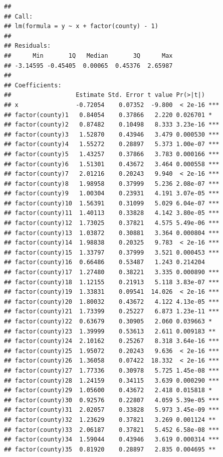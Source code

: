 \documentclass[ignorenonframetext,]{beamer}
\begin{document}
\begin{frame}[fragile]{}

\begin{verbatim}
## 
## Call:
## lm(formula = y ~ x + factor(county) - 1)
## 
## Residuals:
##      Min       1Q   Median       3Q      Max 
## -3.14595 -0.45405  0.00065  0.45376  2.65987 
## 
## Coefficients:
##                  Estimate Std. Error t value Pr(>|t|)    
## x                -0.72054    0.07352  -9.800  < 2e-16 ***
## factor(county)1   0.84054    0.37866   2.220 0.026701 *  
## factor(county)2   0.87482    0.10498   8.333 3.23e-16 ***
## factor(county)3   1.52870    0.43946   3.479 0.000530 ***
## factor(county)4   1.55272    0.28897   5.373 1.00e-07 ***
## factor(county)5   1.43257    0.37866   3.783 0.000166 ***
## factor(county)6   1.51301    0.43672   3.464 0.000558 ***
## factor(county)7   2.01216    0.20243   9.940  < 2e-16 ***
## factor(county)8   1.98958    0.37999   5.236 2.08e-07 ***
## factor(county)9   1.00304    0.23931   4.191 3.07e-05 ***
## factor(county)10  1.56391    0.31099   5.029 6.04e-07 ***
## factor(county)11  1.40113    0.33828   4.142 3.80e-05 ***
## factor(county)12  1.73025    0.37821   4.575 5.49e-06 ***
## factor(county)13  1.03872    0.30881   3.364 0.000804 ***
## factor(county)14  1.98838    0.20325   9.783  < 2e-16 ***
## factor(county)15  1.33797    0.37999   3.521 0.000453 ***
## factor(county)16  0.66486    0.53487   1.243 0.214204    
## factor(county)17  1.27480    0.38221   3.335 0.000890 ***
## factor(county)18  1.12155    0.21913   5.118 3.83e-07 ***
## factor(county)19  1.33831    0.09541  14.026  < 2e-16 ***
## factor(county)20  1.80032    0.43672   4.122 4.13e-05 ***
## factor(county)21  1.73399    0.25227   6.873 1.23e-11 ***
## factor(county)22  0.63679    0.30905   2.060 0.039663 *  
## factor(county)23  1.39999    0.53613   2.611 0.009183 ** 
## factor(county)24  2.10162    0.25267   8.318 3.64e-16 ***
## factor(county)25  1.95072    0.20243   9.636  < 2e-16 ***
## factor(county)26  1.36058    0.07422  18.332  < 2e-16 ***
## factor(county)27  1.77336    0.30978   5.725 1.45e-08 ***
## factor(county)28  1.24159    0.34115   3.639 0.000290 ***
## factor(county)29  1.05600    0.43672   2.418 0.015818 *  
## factor(county)30  0.92576    0.22807   4.059 5.39e-05 ***
## factor(county)31  2.02057    0.33828   5.973 3.45e-09 ***
## factor(county)32  1.23629    0.37821   3.269 0.001124 ** 
## factor(county)33  2.06187    0.37821   5.452 6.58e-08 ***
## factor(county)34  1.59044    0.43946   3.619 0.000314 ***
## factor(county)35  0.81920    0.28897   2.835 0.004695 ** 

\end{verbatim}
\end{frame}
\end{document}
